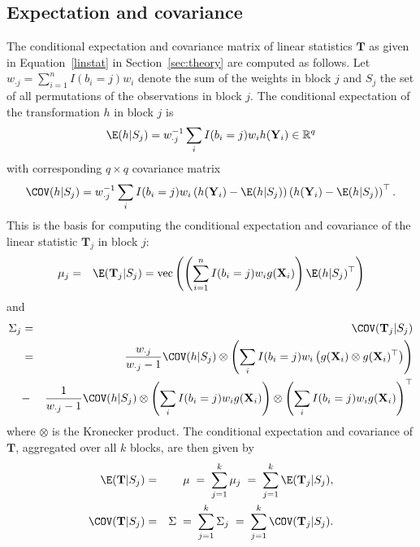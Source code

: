 \documentclass[article]{jss}
\newcommand{\R}{\mathbb{R} }
\newcommand{\V}{\COV}
\newcommand{\X}{\mathbf{X}}
\newcommand{\Y}{\mathbf{Y}}
\newcommand{\T}{\mathbf{T}}
\renewcommand{\vec}{\text{vec}}
\begin{document}
\begin{appendix}

\section{Expectation and covariance} \label{app}

The conditional expectation and covariance matrix of linear statistics
$\T$ as given in Equation~\ref{linstat} in Section~\ref{sec:theory} are computed
as follows.
Let $w_{\cdot j} = \sum_{i = 1}^n I(b_i = j)w_i$ denote the sum of the weights
in block $j$ and $S_j$ the set of all permutations of the observations in block $j$. 
The conditional expectation of the transformation $h$ in block $j$ is
\begin{eqnarray*}
\E(h | S_j) = w_{\cdot j}^{-1} \sum_i I(b_i = j)w_i h(\Y_i) \in \R^q
\end{eqnarray*}
with corresponding $q \times q$ covariance matrix
\begin{eqnarray*}
\V(h | S_j) = w_{\cdot j}^{-1} \sum_i I(b_i = j)w_i \left(h(\Y_i) - \E(h | S_j)
\right) \left(h(\Y_i) - \E(h | S_j)\right)^\top.
\end{eqnarray*}
This is the basis for computing the conditional expectation and covariance of the linear statistic
$\T_j$ in block $j$:
\begin{eqnarray*}
\mu_j & = & \E(\T_j | S_j) = \vec \left( \left( \sum_{i = 1}^n I(b_i = j)w_i g(\X_i) \right) \E(h | S_j)^\top
\right)
\end{eqnarray*}
and
\begin{eqnarray*}
\Sigma_j & = & \V(\T_j | S_j) \nonumber \\
& = &
    \frac{w_{\cdot j}}{w_{\cdot j} - 1}  \V(h | S_j) \otimes
        \left(\sum_i I(b_i = j) w_i  \left( g(\X_i) \otimes g(\X_i)^\top\right) \right)
\label{expectcovar}
\\
& - & \frac{1}{w_{\cdot j} - 1}  \V(h | S_j)  \otimes \left(
        \sum_i I(b_i = j) w_i g(\X_i) \right)
\otimes \left( \sum_i I(b_i = j) w_i g(\X_i)\right)^\top
\nonumber
\end{eqnarray*}
where $\otimes$ is the Kronecker product. The conditional
expectation and covariance of $\T$, aggregated over all $k$ blocks, are
then given by
\begin{eqnarray*}
\E(\T | S_j) & = & \mu  \; = \; \sum_{j = 1}^k \mu_j  \; = \; \sum_{j = 1}^k \E(\T_j | S_j), \\
\V(\T | S_j) & = & \Sigma \; = \; \sum_{j = 1}^k \Sigma_j \; = \; \sum_{j = 1}^k \V(\T_j | S_j).
\end{eqnarray*}

\end{appendix}
\end{document}
